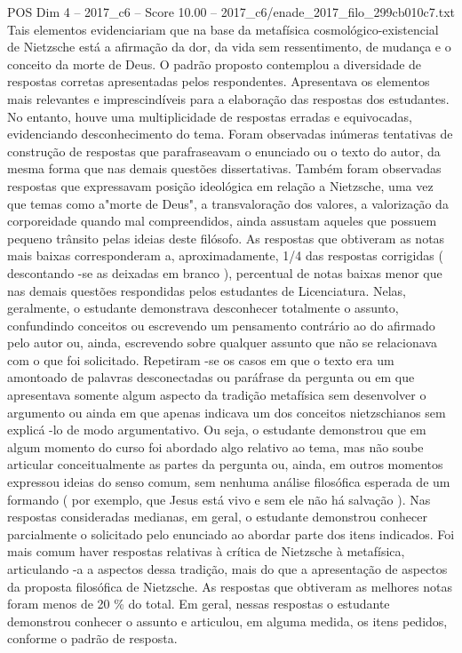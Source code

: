 \begin{textsample}{POS Dim 4 – 2017\_c6 – Score 10.00 – 2017\_c6/enade\_2017\_filo\_299cb010c7.txt}
Tais elementos evidenciariam que na base da metafísica cosmológico-existencial de Nietzsche está a afirmação da dor, da vida sem ressentimento, de mudança e o conceito da morte de Deus.
O padrão proposto contemplou a diversidade de respostas corretas apresentadas pelos respondentes.
Apresentava os elementos mais relevantes e imprescindíveis para a elaboração das respostas dos estudantes.
No entanto, houve uma multiplicidade de respostas erradas e equivocadas, evidenciando desconhecimento do tema.
Foram observadas inúmeras tentativas de construção de respostas que parafraseavam o enunciado ou o texto do autor, da mesma forma que nas demais questões dissertativas.
Também foram observadas respostas que expressavam posição ideológica em relação a Nietzsche, uma vez que temas como a"morte de Deus", a transvaloração dos valores, a valorização da corporeidade quando mal compreendidos, ainda assustam aqueles que possuem pequeno trânsito pelas ideias deste filósofo.
As respostas que obtiveram as notas mais baixas corresponderam a, aproximadamente, 1/4 das respostas corrigidas ( descontando -se as deixadas em branco ), percentual de notas baixas menor que nas demais questões respondidas pelos estudantes de Licenciatura.
Nelas, geralmente, o estudante demonstrava desconhecer totalmente o assunto, confundindo conceitos ou escrevendo um pensamento contrário ao do afirmado pelo autor ou, ainda, escrevendo sobre qualquer assunto que não se relacionava com o que foi solicitado.
Repetiram -se os casos em que o texto era um amontoado de palavras desconectadas ou paráfrase da pergunta ou em que apresentava somente algum aspecto da tradição metafísica sem desenvolver o argumento ou ainda em que apenas indicava um dos conceitos nietzschianos sem explicá -lo de modo argumentativo.
Ou seja, o estudante demonstrou que em algum momento do curso foi abordado algo relativo ao tema, mas não soube articular conceitualmente as partes da pergunta ou, ainda, em outros momentos expressou ideias do senso comum, sem nenhuma análise filosófica esperada de um formando ( por exemplo, que Jesus está vivo e sem ele não há salvação ).
Nas respostas consideradas medianas, em geral, o estudante demonstrou conhecer parcialmente o solicitado pelo enunciado ao abordar parte dos itens indicados.
Foi mais comum haver respostas relativas à crítica de Nietzsche à metafísica, articulando -a a aspectos dessa tradição, mais do que a apresentação de aspectos da proposta filosófica de Nietzsche.
As respostas que obtiveram as melhores notas foram menos de 20 \% do total.
Em geral, nessas respostas o estudante demonstrou conhecer o assunto e articulou, em alguma medida, os itens pedidos, conforme o padrão de resposta.

\end{textsample}
